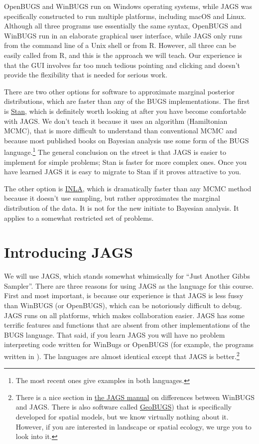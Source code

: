 \documentclass[12pt,english]{article}
\begin{document}
OpenBUGS and WinBUGS run on Windows operating systems, while JAGS was specifically constructed to run multiple platforms, including macOS and Linux. Although all three programs use essentially the same syntax, OpenBUGS and WinBUGS run in an elaborate graphical user interface, while JAGS only runs from the command line of a Unix shell or from R. However, all three can be easily called from R, and this is the approach we will teach. Our experience is that the GUI involves far too much tedious pointing and clicking and doesn't provide the flexibility that is needed for serious work. 

There are two other options for software to approximate marginal posterior distributions, which are  faster than any of the BUGS implementations. The first is \href{http://mc-stan.org/}{Stan}, which is definitely worth looking at after you have become comfortable with JAGS. We don't teach it because it uses an algorithm (Hamiltonian MCMC), that is more difficult to understand than conventional MCMC and because most published books on Bayesian analysis use some form of the BUGS language.\footnote{The most recent ones give examples in both languages.} The general conclusion on the street is that JAGS is easier to implement for simple problems; Stan is faster for more complex ones. Once you have learned JAGS it is easy to migrate to Stan if it proves attractive to you. 

The other option is \href{http://www.r-inla.org/}{INLA}, which is dramatically faster than any MCMC method because it doesn't use sampling, but rather approximates the marginal distribution of the data. It is not for the new initiate to Bayesian analysis. It applies to a somewhat restricted set of problems.

\section{Introducing JAGS}

We will use JAGS, which stands somewhat whimsically for \enquote{Just Another Gibbs Sampler}. There are three reasons for using JAGS as the language for this course. First and most important, is because our experience is that JAGS is less fussy than WinBUGS (or OpenBUGS), which can be notoriously difficult to debug.  JAGS runs on all platforms, which makes collaboration easier. JAGS has some terrific features and functions that are absent from other implementations of the BUGS language. That said, if you learn JAGS you will have no problem interpreting code written for WinBugs or OpenBUGS (for example, the programs written in \citealt{McCarthy_Bayes_book}). The languages are almost identical except that JAGS is better.\footnote{There is a nice section in \href{https://sourceforge.net/projects/mcmc-jags/files/Manuals/4.x/}{the JAGS manual} on differences between WinBUGS and JAGS. There is also software called \href{http://www.mrc-bsu.cam.ac.uk/bugs/winbugs/contents.shtml}{GeoBUGS}) that is specifically developed for spatial models, but we know virtually nothing about it. However, if you are interested in landscape or spatial ecology, we urge you to look into it.}
\end{document}
